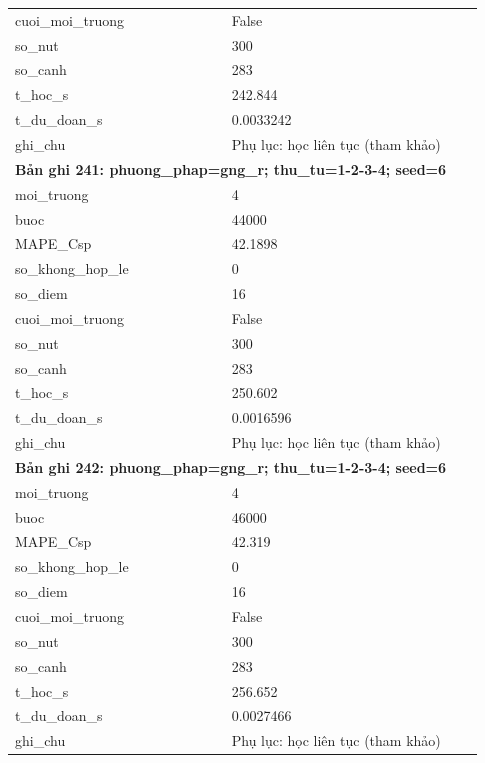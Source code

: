 \begin{longtable}{p{0.43\linewidth}p{0.50\linewidth}}
cuoi\_\allowbreak moi\_\allowbreak truong & False \\
so\_\allowbreak nut & 300 \\
so\_\allowbreak canh & 283 \\
t\_\allowbreak hoc\_\allowbreak s & 242.844 \\
t\_\allowbreak du\_\allowbreak doan\_\allowbreak s & 0.0033242 \\
ghi\_\allowbreak chu & Phụ lục: học liên tục (tham khảo) \\
\midrule
\multicolumn{2}{p{0.95\linewidth}}{\textbf{Bản ghi 241: phuong\_phap=gng\_r; thu\_tu=1-2-3-4; seed=6}} \\
moi\_\allowbreak truong & 4 \\
buoc & 44000 \\
MAPE\_\allowbreak Csp & 42.1898 \\
so\_\allowbreak khong\_\allowbreak hop\_\allowbreak le & 0 \\
so\_\allowbreak diem & 16 \\
cuoi\_\allowbreak moi\_\allowbreak truong & False \\
so\_\allowbreak nut & 300 \\
so\_\allowbreak canh & 283 \\
t\_\allowbreak hoc\_\allowbreak s & 250.602 \\
t\_\allowbreak du\_\allowbreak doan\_\allowbreak s & 0.0016596 \\
ghi\_\allowbreak chu & Phụ lục: học liên tục (tham khảo) \\
\midrule
\multicolumn{2}{p{0.95\linewidth}}{\textbf{Bản ghi 242: phuong\_phap=gng\_r; thu\_tu=1-2-3-4; seed=6}} \\
moi\_\allowbreak truong & 4 \\
buoc & 46000 \\
MAPE\_\allowbreak Csp & 42.319 \\
so\_\allowbreak khong\_\allowbreak hop\_\allowbreak le & 0 \\
so\_\allowbreak diem & 16 \\
cuoi\_\allowbreak moi\_\allowbreak truong & False \\
so\_\allowbreak nut & 300 \\
so\_\allowbreak canh & 283 \\
t\_\allowbreak hoc\_\allowbreak s & 256.652 \\
t\_\allowbreak du\_\allowbreak doan\_\allowbreak s & 0.0027466 \\
ghi\_\allowbreak chu & Phụ lục: học liên tục (tham khảo) \\

\end{longtable}

